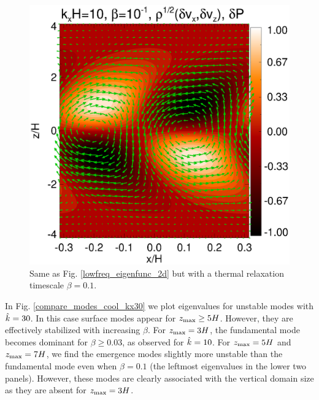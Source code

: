 \begin{figure}
  \includegraphics[width=\linewidth]{figures/result2d_cool}
  \caption{Same as  Fig. \ref{lowfreq_eigenfunc_2d} but with a thermal
    relaxation timescale $\beta=0.1$. 
    \label{lowfreq_eigenfunc_2d_cool}
  }
\end{figure}

In Fig. \ref{compare_modes_cool_kx30} we plot eigenvalues for unstable
modes with $\hat{k}=30$. In this case surface modes appear for
$z_\mathrm{max}\geq5H$. However, they are effectively stabilized with
increasing $\beta$. For $z_\mathrm{max}=3H$, the fundamental mode becomes
dominant for $\beta\geq 0.03$, as observed for $\hat{k}=10$. For
$z_\mathrm{max}=5H$ and $z_\mathrm{max}=7H$, we find the emergence modes slightly more
unstable than the fundamental mode even when $\beta=0.1$ (the leftmost
eigenvalues in the lower two panels). However, these modes are clearly associated
with the vertical domain size as they are absent for $z_\mathrm{max}=3H$. 

